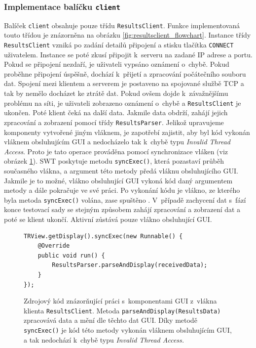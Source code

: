       \subsubsection{Implementace balíčku \texttt{client}}
      Balíček \texttt{client} obsahuje pouze třídu \texttt{ResultsClient}. Funkce implementovaná touto třídou je znázorněna na obrázku \ref{fig:resultsclient_flowchart}. Instance třídy \texttt{ResultsClient} vzniká po zadání detailů připojení a stisku tlačítka \texttt{CONNECT} uživatelem. Instance se poté zkusí připojit k~serveru na zadané IP adrese a portu. Pokud se připojení nezdaří, je uživateli vypsáno oznámení o~chybě. Pokud proběhne připojení úspěšně, dochází k~přijetí a zpracování počátečního souboru dat. Spojení mezi klientem a serverem je postaveno na spojované službě TCP a tak by nemělo docházet ke ztrátě dat. Pokud ovšem dojde k~závažnějšímu problému na síti, je uživateli zobrazeno oznámení o~chybě a \texttt{ResultsClient} je ukončen. Poté klient čeká na další data. Jakmile data obdrží, zahájí jejich zpracování a zobrazení pomocí třídy \texttt{ResultsParser}. Jelikož upravujeme komponenty vytvořené jiným vláknem, je zapotřebí zajistit, aby byl kód vykonán vláknem obsluhujícím GUI a nedocházelo tak k~chybě typu \emph{Invalid Thread Access}. Proto je tato operace prováděna pomocí synchronizace vláken (viz obrázek \ref{code:syncExec}). SWT poskytuje metodu \texttt{syncExec()}, která pozastaví průběh současného vlákna, a argument této metody předá vláknu obsluhujícího GUI. Jakmile je to možné, vlákno obsluhující GUI vykoná kód daný argumentem metody a dále pokračuje ve své práci. Po vykonání kódu je vlákno, ze kterého byla metoda \texttt{syncExec()} volána, zase spuštěno \cite{codeaffine-asyncexec}. V~případě zachycení dat s~fází konce testovací sady se stejným způsobem zahájí zpracování a zobrazení dat a poté se klient ukončí. Aktivní zůstává pouze vlákno obsluhující GUI.

      	\lstset{language=java}
	\begin{figure}
	  \begin{lstlisting}[frame=single]
TRView.getDisplay().syncExec(new Runnable() {
	@Override
	public void run() {
		ResultsParser.parseAndDisplay(receivedData);
	}
});
	  \end{lstlisting}
	  \caption{Zdrojový kód znázorňující práci s~komponentami GUI z~vlákna klienta \texttt{ResultsClient}. Metoda \texttt{parseAndDisplay(ResultsData)} zpracovává data a mění dle těchto dat GUI. Díky metodě \texttt{syncExec()} je kód této metody vykonán vláknem obsluhujícím GUI, a tak nedochází k~chybě typu \emph{Invalid Thread Access.}}
	  \label{code:syncExec}
	\end{figure}

